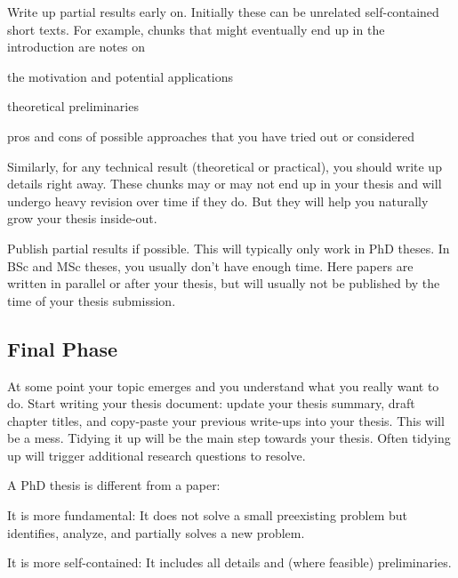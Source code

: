 \documentclass[12pt]{article}
\begin{document}
Write up partial results early on.
Initially these can be unrelated self-contained short texts.
For example, chunks that might eventually end up in the introduction are notes on
\begin{compactitem}
\item the motivation and potential applications
\item theoretical preliminaries
\item pros and cons of possible approaches that you have tried out or considered
\end{compactitem}
Similarly, for any technical result (theoretical or practical), you should write up details right away.
These chunks may or may not end up in your thesis and will undergo heavy revision over time if they do.
But they will help you naturally grow your thesis inside-out.

Publish partial results if possible.
This will typically only work in PhD theses. In BSc and MSc theses, you usually don't have enough time. Here papers are written in parallel or after your thesis, but will usually not be published by the time of your thesis submission.

\subsection{Final Phase}

At some point your topic emerges and you understand what you really want to do.
Start writing your thesis document: update your thesis summary, draft chapter titles, and copy-paste your previous write-ups into your thesis.
This will be a mess.
Tidying it up will be the main step towards your thesis.
Often tidying up will trigger additional research questions to resolve.
\medskip

A PhD thesis is different from a paper:
\begin{compactitem}
\item It is more fundamental: It does not solve a small preexisting problem but identifies, analyze, and partially solves a new problem.
\item It is more self-contained: It includes all details and (where feasible) preliminaries.
\end{compactitem}
\medskip
\end{document}
